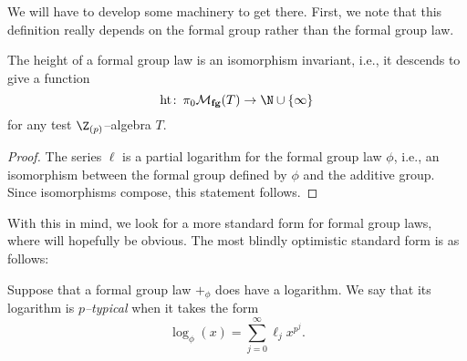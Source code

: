 \noindent We will have to develop some machinery to get there.  First, we note that this definition really depends on the formal group rather than the formal group law.

\begin{lemma}\label{HeightIsAnIsomInvariant}
The height of a formal group law is an isomorphism invariant, i.e., it descends to give a function \[\height\co \pi_0 \moduli{fg}(T) \to \N \cup \{\infty\}\] for any test $\Z_{(p)}$--algebra $T$.
\end{lemma}
\begin{proof}
The series $\ell$ is a partial logarithm for the formal group law $\phi$, i.e., an isomorphism between the formal group defined by $\phi$ and the additive group.  Since isomorphisms compose, this statement follows.
\end{proof}

With this in mind, we look for a more standard form for formal group laws, where  will hopefully be obvious.  The most blindly optimistic standard form is as follows:
\begin{definition}\label{DefnpTypicalLog}
Suppose that a formal group law $+_\phi$ does have a logarithm.  We say that its logarithm is \textit{$p$--typical} when it takes the form \[\log_\phi(x) = \sum_{j=0}^\infty \ell_j x^{p^j}.\]
\end{definition}

